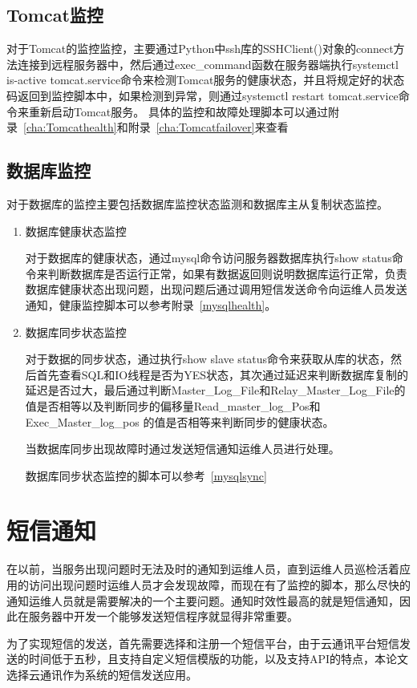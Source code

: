 \subsection{Tomcat监控}
对于Tomcat的监控监控，主要通过Python中ssh库的SSHClient()对象的connect方法连接到远程服务器中，然后通过exec\_command函数在服务器端执行systemctl is-active tomcat.service命令来检测Tomcat服务的健康状态，并且将规定好的状态码返回到监控脚本中，如果检测到异常，则通过systemctl restart tomcat.service命令来重新启动Tomcat服务。
具体的监控和故障处理脚本可以通过附录~\ref{cha:Tomcathealth}和附录~\ref{cha:Tomcatfailover}来查看
\subsection{数据库监控}
对于数据库的监控主要包括数据库监控状态监测和数据库主从复制状态监控。
\begin{enumerate}
\item 数据库健康状态监控

对于数据库的健康状态，通过mysql命令访问服务器数据库执行show status命令来判断数据库是否运行正常，如果有数据返回则说明数据库运行正常，负责数据库健康状态出现问题，出现问题后通过调用短信发送命令向运维人员发送通知，健康监控脚本可以参考附录~\ref{mysqlhealth}。
\item 数据库同步状态监控

对于数据的同步状态，通过执行show slave status命令来获取从库的状态，然后首先查看SQL和IO线程是否为YES状态，其次通过延迟来判断数据库复制的延迟是否过大，最后通过判断Master\_Log\_File和Relay\_Master\_Log\_File的值是否相等以及判断同步的偏移量Read\_master\_log\_Pos和Exec\_Master\_log\_pos 的值是否相等来判断同步的健康状态。

当数据库同步出现故障时通过发送短信通知运维人员进行处理。

数据库同步状态监控的脚本可以参考~\ref{mysqlsync}
\end{enumerate}
\section{短信通知}
在以前，当服务出现问题时无法及时的通知到运维人员，直到运维人员巡检活着应用的访问出现问题时运维人员才会发现故障，而现在有了监控的脚本，那么尽快的通知运维人员就是需要解决的一个主要问题。通知时效性最高的就是短信通知，因此在服务器中开发一个能够发送短信程序就显得非常重要。

为了实现短信的发送，首先需要选择和注册一个短信平台，由于云通讯平台短信发送的时间低于五秒，且支持自定义短信模版的功能，以及支持API的特点，本论文选择云通讯作为系统的短信发送应用。

